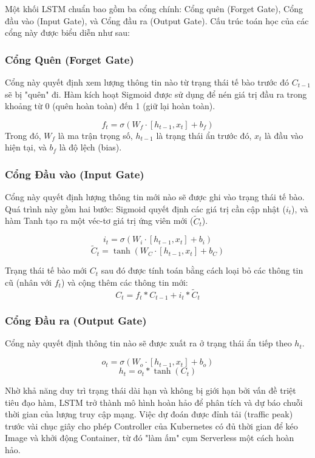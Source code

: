 Một khối LSTM chuẩn bao gồm ba cổng chính: Cổng quên (Forget Gate), Cổng đầu vào (Input Gate), và Cổng đầu ra (Output Gate). Cấu trúc toán học của các cổng này được biểu diễn như sau:

\subsubsection{Cổng Quên (Forget Gate)}
Cổng này quyết định xem lượng thông tin nào từ trạng thái tế bào trước đó $C_{t-1}$ sẽ bị "quên" đi. Hàm kích hoạt Sigmoid được sử dụng để nén giá trị đầu ra trong khoảng từ 0 (quên hoàn toàn) đến 1 (giữ lại hoàn toàn).

\begin{equation}
    f_t = \sigma(W_f \cdot [h_{t-1}, x_t] + b_f)
\end{equation}
Trong đó, $W_f$ là ma trận trọng số, $h_{t-1}$ là trạng thái ẩn trước đó, $x_t$ là đầu vào hiện tại, và $b_f$ là độ lệch (bias).

\subsubsection{Cổng Đầu vào (Input Gate)}
Cổng này quyết định lượng thông tin mới nào sẽ được ghi vào trạng thái tế bào. Quá trình này gồm hai bước: Sigmoid quyết định các giá trị cần cập nhật ($i_t$), và hàm Tanh tạo ra một véc-tơ giá trị ứng viên mới ($\tilde{C}_t$).

\begin{equation}
    i_t = \sigma(W_i \cdot [h_{t-1}, x_t] + b_i)
\end{equation}
\begin{equation}
    \tilde{C}_t = \tanh(W_C \cdot [h_{t-1}, x_t] + b_C)
\end{equation}

Trạng thái tế bào mới $C_t$ sau đó được tính toán bằng cách loại bỏ các thông tin cũ (nhân với $f_t$) và cộng thêm các thông tin mới:
\begin{equation}
    C_t = f_t * C_{t-1} + i_t * \tilde{C}_t
\end{equation}

\subsubsection{Cổng Đầu ra (Output Gate)}
Cổng này quyết định thông tin nào sẽ được xuất ra ở trạng thái ẩn tiếp theo $h_t$.

\begin{equation}
    o_t = \sigma(W_o \cdot [h_{t-1}, x_t] + b_o)
\end{equation}
\begin{equation}
    h_t = o_t * \tanh(C_t)
\end{equation}

Nhờ khả năng duy trì trạng thái dài hạn và không bị giới hạn bởi vấn đề triệt tiêu đạo hàm, LSTM trở thành mô hình hoàn hảo để phân tích và dự báo chuỗi thời gian của lượng truy cập mạng. Việc dự đoán được đỉnh tải (traffic peak) trước vài chục giây cho phép Controller của Kubernetes có đủ thời gian để kéo Image và khởi động Container, từ đó "làm ấm" cụm Serverless một cách hoàn hảo.